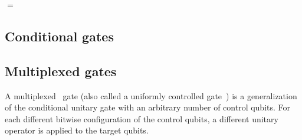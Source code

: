\begin{center}
$=$
\end{center}


\subsection{Conditional gates}
\label{conditional_gates}

\subsection{Multiplexed gates}
A multiplexed~\cite{???,???,???} gate (also called a uniformly controlled gate~\cite{???,???}) is a generalization of the conditional unitary gate with an arbitrary number of control qubits. For each different bitwise configuration of the control qubits, a different unitary operator is applied to the target qubits.


